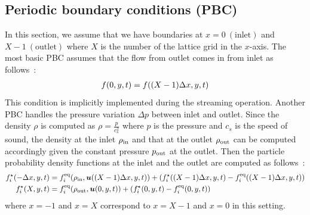 \subsection{Periodic boundary conditions (PBC)}
In this section, we assume that we have
boundaries at $x = 0~(\text{inlet})$ and $X - 1~(\text{outlet})$
where $X$ is the number of the lattice grid in the $x$-axis.
The most basic PBC assumes that
the flow from outlet comes in from inlet as follows~\cite{succi2018lattice}: 
\begin{equation}
\begin{aligned}
  f(0, y, t) = f((X - 1)\Delta x, y, t)
\end{aligned}
\end{equation}
This condition is implicitly implemented during the streaming operation.
Another PBC handles
the pressure variation $\Delta p$ between inlet and outlet.
Since the density $\rho$ is computed as $\rho = \frac{p}{c_s^2}$
where $p$ is the pressure and $c_s$ is the speed of sound,
the density at the inlet $\rho_{\rm in}$ and
that at the outlet $\rho_{\rm out}$ can be computed
accordingly given the constant pressure $p_{\rm out}$
at the outlet.
Then the particle probability density functions at 
the inlet and the outlet are computed as follows~\cite{succi2018lattice}:
\begin{equation}
\begin{aligned}
  f_i^\star(-\Delta x, y, t) &=
  f_i^{\rm eq}(\rho_{\rm in}, \boldsymbol{u}((X - 1)\Delta x, y, t))
  + (f_i^\star((X - 1)\Delta x, y, t) - f_i^{\rm eq}((X - 1)\Delta x, y, t))\\
  f_i^\star(X, y, t) &=
  f_i^{\rm eq}(\rho_{\rm out}, \boldsymbol{u}(0, y, t))
  + (f_i^\star(0, y, t) - f_i^{\rm eq}(0, y, t))\\
\end{aligned}
\label{discretized-pbc-pressure}
\end{equation}
where $x = -1$ and $x = X$ correspond to $x = X - 1$ and $x = 0$
in this setting.
